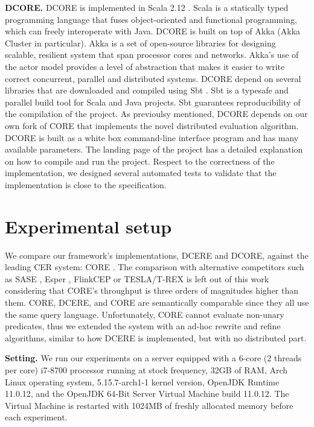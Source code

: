 \textbf{DCORE.} DCORE is implemented in Scala 2.12 \cite{scala}. Scala \cite{scala} is a statically typed programming language that fuses object-oriented and functional programming, which can freely interoperate with Java. DCORE is built on top of Akka \cite{akka} (Akka Cluster in particular). Akka is a set of open-source libraries for designing scalable, resilient system that span processor cores and networks. Akka’s use of the actor model provides a level of abstraction that makes it easier to write correct concurrent, parallel and distributed systems. DCORE depend on several libraries that are downloaded and compiled using Sbt \cite{sbt}. Sbt is a typesafe and parallel build tool for Scala and Java projects. Sbt guarantees reproducibility of the compilation of the project. As previoulsy mentioned, DCORE depends on our own fork of CORE that implements the novel distributed evaluation algorithm. DCORE is built as a white box command-line interface program and has many available parameters. The landing page of the project has a detailed explanation on how to compile and run the project. Respect to the correctness of the implementation, we designed several automated tests to validate that the implementation is close to the specification.

\section{Experimental setup}\label{sec:setup}

We compare our framework's implementations, DCERE and DCORE, against the leading CER system: CORE \cite{core}.
The comparison with alternative competitors such as SASE \cite{sase}, Esper \cite{esper}, FlinkCEP \cite{flink-cep} or TESLA/T-REX \cite{tesla} is left out of this work considering that CORE's throughput is three orders of magnitudes higher than them. CORE, DCERE, and CORE are semantically comparable since they all use the same query language. Unfortunately, CORE cannot evaluate non-unary predicates, thus we extended the system with an ad-hoc rewrite and refine algorithms, similar to how DCERE is implemented, but with no distributed part.

\textbf{Setting.} We run our experiments on a server equipped with a 6-core (2 threads per core) i7-8700 processor running at stock frequency, 32GB of RAM, Arch Linux operating system, 5.15.7-arch1-1 kernel version, OpenJDK Runtime 11.0.12, and the OpenJDK 64-Bit Server Virtual Machine build 11.0.12. The Virtual Machine is restarted with 1024MB of freshly allocated memory before each experiment.

